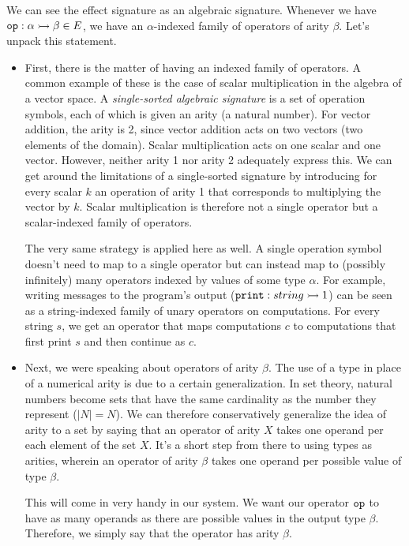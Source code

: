 We can see the effect signature as an algebraic signature. Whenever we have
$\mathtt{op} : \alpha \rightarrowtail \beta \in E$, we have an $\alpha$-indexed family of
operators of arity $\beta$. Let's unpack this statement.

\begin{itemize}
\item First, there is the matter of having an indexed family of
  operators. A common example of these is the case of scalar multiplication
  in the algebra of a vector space. A \emph{single-sorted algebraic
    signature} is a set of operation symbols, each of which is given an
  arity (a natural number). For vector addition, the arity is 2, since
  vector addition acts on two vectors (two elements of the
  domain). Scalar multiplication acts on one scalar and one
  vector. However, neither arity 1 nor arity 2 adequately express this. We
  can get around the limitations of a single-sorted signature by
  introducing for every scalar $k$ an operation of arity 1 that corresponds
  to multiplying the vector by $k$. Scalar multiplication is therefore not
  a single operator but a scalar-indexed family of operators.

  The very same strategy is applied here as well. A single operation symbol
  doesn't need to map to a single operator but can instead map to (possibly
  infinitely) many operators indexed by values of some type $\alpha$. For
  example, writing messages to the program's output
  ($\mathtt{print} : string \rightarrowtail 1$) can be seen as a string-indexed family of
  unary operators on computations. For every string $s$, we get an operator
  that maps computations $c$ to computations that first print $s$ and then
  continue as $c$.

\item Next, we were speaking about operators of arity $\beta$. The use of a
  type in place of a numerical arity is due to a certain generalization. In
  set theory, natural numbers become sets that have the same cardinality as
  the number they represent ($\left\vert N \right\vert = N$). We can
  therefore conservatively generalize the idea of arity to a set by saying
  that an operator of arity $X$ takes one operand per each element of the
  set $X$. It's a short step from there to using types as arities, wherein
  an operator of arity $\beta$ takes one operand per possible value of type
  $\beta$.

  This will come in very handy in our system. We want our operator
  $\mathtt{op}$ to have as many operands as there are possible values in the
  output type $\beta$. Therefore, we simply say that the operator has arity
  $\beta$.


\end{itemize}
